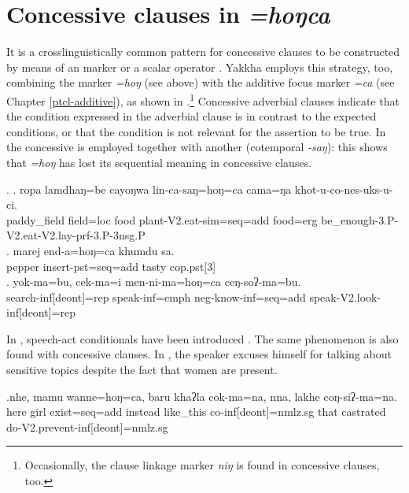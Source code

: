 \section{Concessive clauses in \emph{=hoŋca}}\label{adv-cl-conc}
\largerpage
It is a crosslinguistically common pattern for concessive clauses to be constructed by means of an  marker or a scalar operator \citep[980]{Koenig1993_Focus}. Yakkha employs this strategy, too, combining the  marker  \emph{=hoŋ} (see above) with the additive focus marker \emph{=ca} (see Chapter \ref{ptcl-additive}), as shown in \Next.\footnote{Occasionally, the   clause linkage marker \emph{niŋ} is found in concessive clauses, too.} Concessive adverbial clauses indicate that the condition expressed in the adverbial clause is in contrast to the expected conditions, or that the condition is not relevant for the assertion to be true. In \Next[a] the concessive is employed together with another  (cotemporal \emph{-saŋ}): this shows that  \emph{=hoŋ} has lost its sequential meaning in concessive clauses.

\ex. \ag. ropa  lamdhaŋ=be    cayoŋwa  lin-ca-saŋ=hoŋ=ca  cama=ŋa   khot-u-co-nes-uks-u-ci.\\
paddy\_field field{\sc =loc} food plant{\sc -V2.eat-sim=seq=add} food{\sc =erg} be\_enough{\sc -3.P-V2.eat-V2.lay-prf-3.P-3nsg.P}\\
 
\bg. marej end-a=hoŋ=ca khumdu sa.\\
 pepper insert{\sc [3sg]-pst=seq=add} tasty {\sc cop.pst[3]}\\
 \bg. yok-ma=bu, cek-ma=i men-ni-ma=hoŋ=ca ceŋ-soʔ-ma=bu.\\
 search{\sc -inf[deont]=rep} speak{\sc -inf=emph} {\sc neg-}know{\sc -inf=seq=add} speak{\sc -V2.look-inf[deont]=rep}\\
 
 In , speech-act conditionals have been introduced \citep{Thompsonetal2007_Adverbial}. The same phenomenon is also found with concessive clauses. In \Next, the speaker excuses himself for talking about sensitive topics despite the fact that women are present. 
 
 \exg.nhe, mamu wanne=hoŋ=ca,  baru   khaʔla   cok-ma=na,  nna, lakhe     coŋ-siʔ-ma=na.\\
 here girl exist{\sc [3;npst]=seq=add} instead like\_this co{\sc -inf[deont]=nmlz.sg} that castrated do{\sc -V2.prevent-inf[deont]=nmlz.sg}\\
  
 
